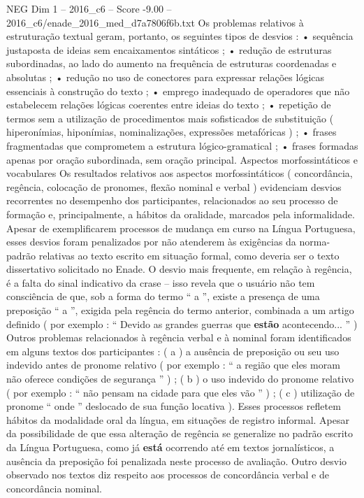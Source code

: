 \begin{textsample}{NEG Dim 1 – 2016\_c6 – Score -9.00 – 2016\_c6/enade\_2016\_med\_d7a7806f6b.txt}
Os problemas relativos à estruturação textual geram, portanto, os seguintes tipos de desvios : • sequência justaposta de ideias sem encaixamentos sintáticos ; • redução de estruturas subordinadas, ao lado do aumento na frequência de estruturas coordenadas e absolutas ; • redução no uso de conectores para expressar relações lógicas essenciais à construção do texto ; • emprego inadequado de operadores que não estabelecem relações lógicas coerentes entre ideias do texto ; • repetição de termos sem a utilização de procedimentos mais sofisticados de substituição ( hiperonímias, hiponímias, nominalizações, expressões metafóricas ) ; • frases fragmentadas que comprometem a estrutura lógico-gramatical ; • frases formadas apenas por oração subordinada, sem oração principal.
Aspectos morfossintáticos e vocabulares Os resultados relativos aos aspectos morfossintáticos ( concordância, regência, colocação de pronomes, flexão nominal e verbal ) evidenciam desvios recorrentes no desempenho dos participantes, relacionados ao seu processo de formação e, principalmente, a hábitos da oralidade, marcados pela informalidade.
Apesar de exemplificarem processos de mudança em curso na Língua Portuguesa, esses desvios foram penalizados por não atenderem às exigências da norma-padrão relativas ao texto escrito em situação formal, como deveria ser o texto dissertativo solicitado no Enade.
O desvio mais frequente, em relação à regência, é a falta do sinal indicativo da crase – isso revela que o usuário não tem consciência de que, sob a forma do termo “ a ”, existe a presença de uma preposição “ a ”, exigida pela regência do termo anterior, combinada a um artigo definido ( por exemplo : “ Devido as grandes guerras que \textbf{estão} acontecendo... ” ) Outros problemas relacionados à regência verbal e à nominal foram identificados em alguns textos dos participantes : ( a ) a ausência de preposição ou seu uso indevido antes de pronome relativo ( por exemplo : “ a região que eles moram não oferece condições de segurança ” ) ; ( b ) o uso indevido do pronome relativo ( por exemplo : “ não pensam na cidade para que eles vão ” ) ; ( c ) utilização de pronome “ onde ” deslocado de sua função locativa ).
Esses processos refletem hábitos da modalidade oral da língua, em situações de registro informal.
Apesar da possibilidade de que essa alteração de regência se generalize no padrão escrito da Língua Portuguesa, como já \textbf{está} ocorrendo até em textos jornalísticos, a ausência da preposição foi penalizada neste processo de avaliação.
Outro desvio observado nos textos diz respeito aos processos de concordância verbal e de concordância nominal.

\end{textsample}
